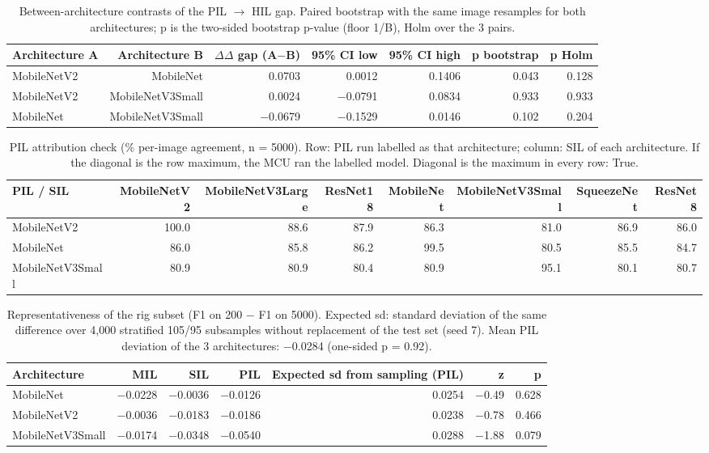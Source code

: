 \begin{table}[htbp]
\centering
\scriptsize
\caption{Between-architecture contrasts of the PIL $\rightarrow$ HIL gap. Paired bootstrap with the same image resamples for both architectures; p is the two-sided bootstrap p-value (floor 1/B), Holm over the 3 pairs.}
\label{tab:ladder-coco-niclavision-6}
\begin{tabular}{lrrrrrr}
\toprule
Architecture A & Architecture B & $\Delta$$\Delta$ gap (A$-$B) & 95\% CI low & 95\% CI high & p bootstrap & p Holm \\
\midrule
MobileNetV2 & MobileNet & 0.0703 & 0.0012 & 0.1406 & 0.043 & 0.128 \\
MobileNetV2 & MobileNetV3Small & 0.0024 & $-$0.0791 & 0.0834 & 0.933 & 0.933 \\
MobileNet & MobileNetV3Small & $-$0.0679 & $-$0.1529 & 0.0146 & 0.102 & 0.204 \\
\bottomrule
\end{tabular}
\end{table}

\begin{table}[htbp]
\centering
\scriptsize
\caption{PIL attribution check (\% per-image agreement, n = 5000). Row: PIL run labelled as that architecture; column: SIL of each architecture. If the diagonal is the row maximum, the MCU ran the labelled model. Diagonal is the maximum in every row: True.}
\label{tab:ladder-coco-niclavision-7}
\begin{tabular}{lrrrrrrr}
\toprule
PIL / SIL & MobileNetV2 & MobileNetV3Large & ResNet18 & MobileNet & MobileNetV3Small & SqueezeNet & ResNet8 \\
\midrule
MobileNetV2 & 100.0 & 88.6 & 87.9 & 86.3 & 81.0 & 86.9 & 86.0 \\
MobileNet & 86.0 & 85.8 & 86.2 & 99.5 & 80.5 & 85.5 & 84.7 \\
MobileNetV3Small & 80.9 & 80.9 & 80.4 & 80.9 & 95.1 & 80.1 & 80.7 \\
\bottomrule
\end{tabular}
\end{table}

\begin{table}[htbp]
\centering
\scriptsize
\caption{Representativeness of the rig subset (F1 on 200 $-$ F1 on 5000). Expected sd: standard deviation of the same difference over 4,000 stratified 105/95 subsamples without replacement of the test set (seed 7). Mean PIL deviation of the 3 architectures: $-$0.0284 (one-sided p = 0.92).}
\label{tab:ladder-coco-niclavision-8}
\begin{tabular}{lrrrrrr}
\toprule
Architecture & MIL & SIL & PIL & Expected sd from sampling (PIL) & z & p \\
\midrule
MobileNet & $-$0.0228 & $-$0.0036 & $-$0.0126 & 0.0254 & $-$0.49 & 0.628 \\
MobileNetV2 & $-$0.0036 & $-$0.0183 & $-$0.0186 & 0.0238 & $-$0.78 & 0.466 \\
MobileNetV3Small & $-$0.0174 & $-$0.0348 & $-$0.0540 & 0.0288 & $-$1.88 & 0.079 \\
\bottomrule
\end{tabular}
\end{table}
